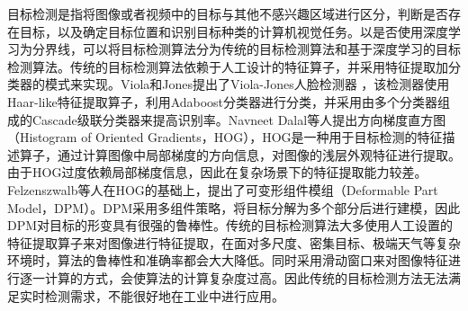 目标检测是指将图像或者视频中的目标与其他不感兴趣区域进行区分，判断是否存在目标，以及确定目标位置和识别目标种类的计算机视觉任务。以是否使用深度学习为分界线，可以将目标检测算法分为传统的目标检测算法和基于深度学习的目标检测算法。传统的目标检测算法依赖于人工设计的特征算子，并采用特征提取加分类器的模式来实现。Viola和Jones提出了Viola-Jones人脸检测器 \cite{viola2001rapid}，该检测器使用Haar-like特征提取算子，利用Adaboost分类器进行分类，并采用由多个分类器组成的Cascade级联分类器来提高识别率。Navneet Dalal等人\cite{dalal2005histograms}提出方向梯度直方图（Histogram of Oriented Gradients，HOG），HOG是一种用于目标检测的特征描述算子，通过计算图像中局部梯度的方向信息，对图像的浅层外观特征进行提取。由于HOG过度依赖局部梯度信息，因此在复杂场景下的特征提取能力较差。Felzenszwalb等人\cite{felzenszwalb2009object}在HOG的基础上，提出了可变形组件模组（Deformable Part Model，DPM）。DPM采用多组件策略，将目标分解为多个部分后进行建模，因此DPM对目标的形变具有很强的鲁棒性。传统的目标检测算法大多使用人工设置的特征提取算子来对图像进行特征提取，在面对多尺度、密集目标、极端天气等复杂环境时，算法的鲁棒性和准确率都会大大降低。同时采用滑动窗口来对图像特征进行逐一计算的方式，会使算法的计算复杂度过高。因此传统的目标检测方法无法满足实时检测需求，不能很好地在工业中进行应用。

